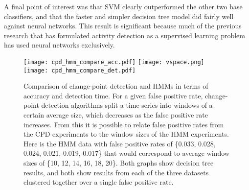 
A final point of interest was that SVM clearly outperformed the other two
base classifiers, and that the faster and simpler decision tree model did fairly
well against neural networks. This result is significant because much of the
previous research that has formulated activity detection as a supervised learning
problem has used neural networks exclusively.

\begin{figure}[h]
 \centering
 \texttt{[image: cpd\_hmm\_compare\_acc.pdf]}
 \texttt{[image: vspace.png]}
 \texttt{[image: cpd\_hmm\_compare\_det.pdf]}
 \caption{Comparison of change-point detection and HMMs in terms of accuracy
  and detection time. For a given false positive rate, change-point detection
  algorithms split a time series into windows of a certain average size, which
  decreases as the false positive rate increases. From this it is possible to relate
  false positive rates from the CPD experiments to the window sizes of the
  HMM experiments. Here is the HMM data with false positive rates of 
  \{0.033, 0.028, 0.024, 0.021, 0.019, 0.017\} that would
  correspond to average window sizes of \{10, 12, 14, 16, 18, 20\}. Both
  graphs show decision tree results, and both show results from each of the
  three datasets clustered together over a single false positive rate.}
 \label{fig:compare_acc}
\end{figure}
